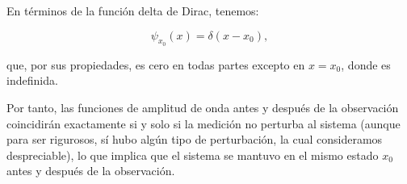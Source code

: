 \begin{problema}
\begin{sol}
\begin{itemize}
            En términos de la función delta de Dirac, tenemos:
            
            \begin{equation*}
            \psi_{x_0}(x) = \delta(x - x_0),
            \end{equation*}
            
            que, por sus propiedades, es cero en todas partes excepto en $x = x_0$, donde es indefinida.
        \end{itemize}

Por tanto, las funciones de amplitud de onda antes y después de la observación coincidirán exactamente si y solo si la medición no perturba al sistema (aunque para ser rigurosos, sí hubo algún tipo de perturbación, la cual consideramos despreciable), lo que implica que el sistema se mantuvo en el mismo estado $x_0$ antes y después de la observación. 
    \end{sol}
\end{problema}

